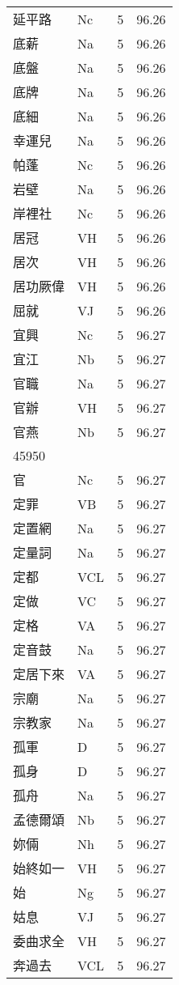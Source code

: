\documentclass[twocolumn]{book}
\begin{document}
\begin{supertabular}{llrr}
延平路 & Nc & 5 &  96.26\\
底薪 & Na & 5 &  96.26\\
底盤 & Na & 5 &  96.26\\
底牌 & Na & 5 &  96.26\\
底細 & Na & 5 &  96.26\\
幸運兒 & Na & 5 &  96.26\\
帕蓬 & Nc & 5 &  96.26\\
岩壁 & Na & 5 &  96.26\\
岸裡社 & Nc & 5 &  96.26\\
居冠 & VH & 5 &  96.26\\
居次 & VH & 5 &  96.26\\
居功厥偉 & VH & 5 &  96.26\\
屈就 & VJ & 5 &  96.26\\
宜興 & Nc & 5 &  96.27\\
宜江 & Nb & 5 &  96.27\\
官職 & Na & 5 &  96.27\\
官辦 & VH & 5 &  96.27\\
官燕 & Nb & 5 &  96.27\\
45950\\
官 & Nc & 5 &  96.27\\
定罪 & VB & 5 &  96.27\\
定置網 & Na & 5 &  96.27\\
定量詞 & Na & 5 &  96.27\\
定都 & VCL & 5 &  96.27\\
定做 & VC & 5 &  96.27\\
定格 & VA & 5 &  96.27\\
定音鼓 & Na & 5 &  96.27\\
定居下來 & VA & 5 &  96.27\\
宗廟 & Na & 5 &  96.27\\
宗教家 & Na & 5 &  96.27\\
孤軍 & D & 5 &  96.27\\
孤身 & D & 5 &  96.27\\
孤舟 & Na & 5 &  96.27\\
孟德爾頌 & Nb & 5 &  96.27\\
妳倆 & Nh & 5 &  96.27\\
始終如一 & VH & 5 &  96.27\\
始 & Ng & 5 &  96.27\\
姑息 & VJ & 5 &  96.27\\
委曲求全 & VH & 5 &  96.27\\
奔過去 & VCL & 5 &  96.27\\

\end{supertabular}
\end{document}
